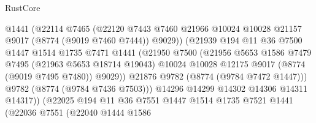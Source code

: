 \begin{lexlean}{RustCore}
\begin{coremodule}
                                @1441
                                (@22114
                                  @7465
                                  (@22120
                                    @7443
                                    @7460
                                    @21966
                                    @10024
                                    @10028
                                    @21157
                                    @9017
                                    (@8774 (@9019 @7460 @7444))
                                    @9029))
                                (@21939
                                  @194
                                  @11
                                  @36
                                  @7500
                                  @1447
                                  @1514
                                  @1735
                                  @7471
                                  @1441
                                  (@21950
                                    @7500
                                    (@21956
                                      @5653
                                      @1586
                                      @7479
                                      @7495
                                      (@21963 @5653 @18714 @19043)
                                      @10024
                                      @10028
                                      @12175
                                      @9017
                                      (@8774 (@9019 @7495 @7480))
                                      @9029))
                                  @21876
                                  @9782
                                  (@8774 (@9784 @7472 @1447)))
                                @9782
                                (@8774 (@9784 @7436 @7503)))
                              @14296
                              @14299
                              @14302
                              @14306
                              @14311
                              @14317))
                          (@22025
                            @194
                            @11
                            @36
                            @7551
                            @1447
                            @1514
                            @1735
                            @7521
                            @1441
                            (@22036
                              @7551
                              (@22040
                                @1444
                                @1586

\end{coremodule}
\end{lexlean}
